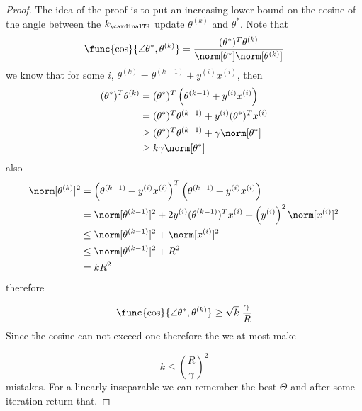 \begin{proof}
    The idea of the proof is to put an increasing lower bound on the cosine of the angle between the \(k_{\cardinalTH}\) update \(\theta^{(k)}\) and \(\theta^{\ast}\). Note that 
    \begin{equation*}
        \func{\cos}{\angle \theta^{\ast} , \theta^{(k)}} = \dfrac{(\theta^{\ast})^T \theta^{(k)}}{\norm[\theta^{\ast}] \norm[\theta^{(k)}]}
    \end{equation*}
    we know that for some \(i\), \(\theta^{(k)} = \theta^{(k - 1)} + y^{(i)} x^{(i)}\), then 
    \begin{align*}
        (\theta^{\ast})^T \theta^{(k)} &= (\theta^{\ast})^T \left(\theta^{(k- 1)} + y^{(i)} x^{(i)} \right) \\
        &=(\theta^{\ast})^T \theta^{(k- 1)}+   y^{(i)} (\theta^{\ast})^T x^{(i)} \\
        &\geq  (\theta^{\ast})^T \theta^{(k- 1)} + \gamma \norm[\theta^{\ast}]\\
        &\geq  k \gamma \norm[\theta^{\ast}]
    \end{align*}
    also 
    \begin{align*}
        \norm[\theta^{(k)}]^2 &=  \left(\theta^{(k- 1)} + y^{(i)} x^{(i)} \right)^T  \left(\theta^{(k- 1)} + y^{(i)} x^{(i)} \right)\\
        &= \norm[\theta^{(k-1)}]^2 + 2y^{(i)} (\theta^{(k-1)})^T x^{(i)} + \left( y^{(i)}\right)^2 \norm[x^{(i)}]^2 \\
        &\leq  \norm[\theta^{(k-1)}]^2 +  \norm[x^{(i)}]^2 \\
        &\leq  \norm[\theta^{(k-1)}]^2 + R^2 \\
        &= kR^2
    \end{align*}
    therefore 

    \begin{equation*}
        \func{\cos}{\angle \theta^{\ast} , \theta^{(k)}} \geq \sqrt{k} \; \frac{\gamma}{R}
    \end{equation*}
    Since the cosine can not exceed one therefore the we at most make 

    \begin{equation*}
        k \leq \left(\dfrac{R}{\gamma}\right)^2 
    \end{equation*}
    mistakes.
    For a linearly inseparable we can remember the best \(\Theta\) and after some iteration return that.
 \end{proof}

